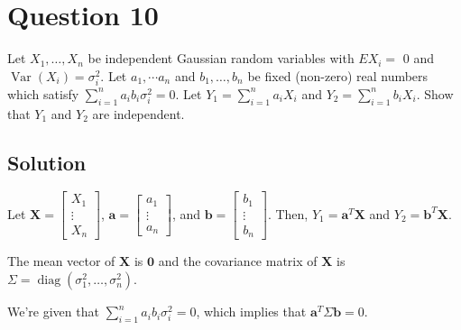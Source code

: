 \section*{Question 10}

Let \( X_{1}, \dots, X_{n} \) be independent Gaussian random variables with \( E X_{i}= \) 0 and \( \operatorname{Var}\left(X_{i}\right)=\sigma_{i}^{2} \).
Let \( a_{1}, \cdots a_{n} \) and \( b_{1}, \dots, b_{n} \) be fixed (non-zero) real numbers which satisfy \( \sum_{i=1}^{n} a_{i} b_{i} \sigma_{i}^{2}=0 \).
Let \( Y_{1}=\sum_{i=1}^{n} a_{i} X_{i} \) and \( Y_{2}=\sum_{i=1}^{n} b_{i} X_{i} \).
Show that \( Y_{1} \) and \( Y_{2} \) are independent.

\subsection*{Solution}

Let \( \mathbf{X} = \begin{bmatrix} X_{1} \\ \vdots \\ X_{n} \end{bmatrix} \), \( \mathbf{a} = \begin{bmatrix} a_{1} \\ \vdots \\ a_{n} \end{bmatrix} \), and \( \mathbf{b} = \begin{bmatrix} b_{1} \\ \vdots \\ b_{n} \end{bmatrix} \).
Then, \( Y_{1} = \mathbf{a}^{T} \mathbf{X} \) and \( Y_{2} = \mathbf{b}^{T} \mathbf{X} \).

The mean vector of \( \mathbf{X} \) is \( \mathbf{0} \) and the covariance matrix of \( \mathbf{X} \) is \( \Sigma = \operatorname{diag}(\sigma_{1}^{2}, \dots, \sigma_{n}^{2}) \).

We're given that \( \sum_{i=1}^{n} a_{i} b_{i} \sigma_{i}^{2} = 0 \), which implies that \( \mathbf{a}^{T} \Sigma \mathbf{b} = 0 \).
